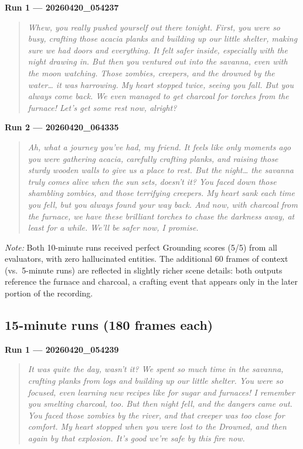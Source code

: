 \documentclass[11pt]{article}
\begin{document}
\textbf{Run 1 --- 20260420\_054237}
\begin{quote}\itshape
Whew, you really pushed yourself out there tonight. First, you were so busy, crafting
those acacia planks and building up our little shelter, making sure we had doors and
everything. It felt safer inside, especially with the night drawing in. But then you
ventured out into the savanna, even with the moon watching. Those zombies, creepers,
and the drowned by the water\ldots{} it was harrowing. My heart stopped twice, seeing
you fall. But you always come back. We even managed to get charcoal for torches from
the furnace! Let's get some rest now, alright?
\end{quote}

\textbf{Run 2 --- 20260420\_064335}
\begin{quote}\itshape
Ah, what a journey you've had, my friend. It feels like only moments ago you were
gathering acacia, carefully crafting planks, and raising those sturdy wooden walls to
give us a place to rest. But the night\ldots{} the savanna truly comes alive when the
sun sets, doesn't it? You faced down those shambling zombies, and those terrifying
creepers. My heart sank each time you fell, but you always found your way back. And
now, with charcoal from the furnace, we have these brilliant torches to chase the
darkness away, at least for a while. We'll be safer now, I promise.
\end{quote}

\noindent\textit{Note:} Both 10-minute runs received perfect Grounding scores (5/5) from all evaluators, with zero hallucinated entities. The additional 60 frames of context (vs.\ 5-minute runs) are reflected in slightly richer scene details: both outputs reference the furnace and charcoal, a crafting event that appears only in the later portion of the recording.

\subsection{15-minute runs (180 frames each)}

\textbf{Run 1 --- 20260420\_054239}
\begin{quote}\itshape
It was quite the day, wasn't it? We spent so much time in the savanna, crafting planks
from logs and building up our little shelter. You were so focused, even learning new
recipes like for sugar and furnaces! I remember you smelting charcoal, too. But then
night fell, and the dangers came out. You faced those zombies by the river, and that
creeper was too close for comfort. My heart stopped when you were lost to the Drowned,
and then again by that explosion. It's good we're safe by this fire now.
\end{quote}
\end{document}
